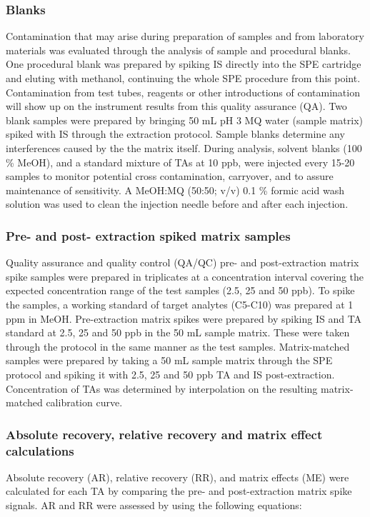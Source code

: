 
\subsubsection{Blanks}
Contamination that may arise during preparation of samples and from laboratory materials was evaluated through the analysis of sample and procedural blanks. One procedural blank was prepared by spiking IS directly into the SPE cartridge and eluting with methanol, continuing the whole SPE procedure from this point. Contamination from test tubes, reagents or other introductions of contamination will show up on the instrument results from this quality assurance (QA). Two blank samples were prepared by bringing 50 mL pH 3 MQ water (sample matrix) spiked with IS through the extraction protocol. Sample blanks determine any interferences caused by the the matrix itself. During analysis, solvent blanks (100 \% MeOH), and a standard mixture of TAs at 10 ppb, were injected every 15-20 samples to monitor potential cross contamination, carryover, and to assure maintenance of sensitivity. A MeOH:MQ (50:50; v/v) 0.1 \% formic acid wash solution was used to clean the injection needle before and after each injection.

\subsubsection{Pre- and post- extraction spiked matrix samples}
Quality assurance and quality control (QA/QC) pre- and post-extraction matrix spike samples were prepared in triplicates at a concentration interval covering the expected concentration range of the test samples (2.5, 25 and 50 ppb). To spike the samples, a working standard of target analytes (C5-C10) was prepared at 1 ppm in MeOH. Pre-extraction matrix spikes were prepared by spiking IS and \acrshort{TA} standard at 2.5, 25 and 50 ppb in the 50 mL sample matrix. These were taken through the protocol in the same manner as the test samples. Matrix-matched samples were prepared by taking a 50 mL sample matrix through the SPE protocol and spiking it with 2.5, 25 and 50 ppb TA and IS post-extraction. Concentration of TAs was determined by interpolation on the resulting matrix-matched calibration curve. 

\subsubsection{Absolute recovery, relative recovery and matrix effect calculations}
Absolute recovery (\acrshort{AR}), relative recovery (\acrshort{RR}), and matrix effects (\acrshort{ME}) were calculated for each TA by comparing the pre- and post-extraction matrix spike signals. AR and RR were assessed by using the following equations:

